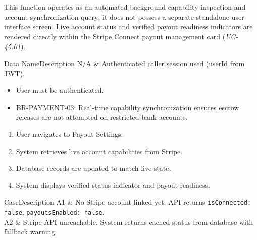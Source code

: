 \noindent This function operates as an automated background capability inspection and account synchronization query; it does not possess a separate standalone user interface screen. Live account status and verified payout readiness indicators are rendered directly within the Stripe Connect payout management card (\textit{UC-45.01}).


\begin{specdatatable}{Data Name}{Description}
      N/A & Authenticated caller session used (userId from JWT).\\ \hline
\end{specdatatable}

\begin{itemize}[leftmargin=1.6em,topsep=3pt,itemsep=2pt,parsep=0pt,label=$\bullet$]
      \item User must be authenticated.
\end{itemize}

\begin{itemize}[leftmargin=1.6em,topsep=3pt,itemsep=2pt,parsep=0pt,label=$\bullet$]\brrulelist
      \item BR-PAYMENT-03: Real-time capability synchronization ensures escrow releases are not attempted on restricted bank accounts.
\end{itemize}

\begin{enumerate}[leftmargin=1.8em,topsep=3pt,itemsep=2pt,parsep=0pt]
      \item User navigates to Payout Settings.
      \item System retrieves live account capabilities from Stripe.
      \item Database records are updated to match live state.
      \item System displays verified status indicator and payout readiness.
\end{enumerate}

\begin{flowtable}{Case}{Description}
      A1 & No Stripe account linked yet. API returns \texttt{isConnected: false}, \texttt{payoutsEnabled: false}.\\ \hline
      A2 & Stripe API unreachable. System returns cached status from database with fallback warning.\\ \hline
\end{flowtable}

